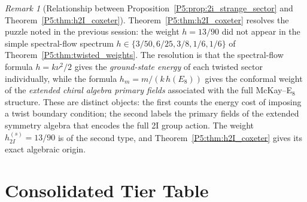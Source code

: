 \documentclass[11pt,a4paper]{article}
\theoremstyle{definition}
\theoremstyle{remark}
\newtheorem{remark}[theorem]{Remark}
\begin{document}
\begin{remark}[Relationship between Proposition~\ref{P5:prop:2i_strange_sector} and Theorem~\ref{P5:thm:h2I_coxeter}]
\label{P5:rem:h2I_status}
Theorem~\ref{P5:thm:h2I_coxeter} resolves the puzzle noted in the previous
session: the weight $h=13/90$ did not appear in the simple spectral-flow
spectrum $h \in \{3/50, 6/25, 3/8, 1/6, 1/6\}$ of
Theorem~\ref{P5:thm:twisted_weights}.
The resolution is that the spectral-flow formula $h = k\nu^2/2$ gives the
\emph{ground-state energy} of each twisted sector individually, while the
formula $h_m = m/(k\,h(E_8))$ gives the conformal weight of the
\emph{extended chiral algebra primary fields} associated with the full
McKay--E$_8$~\cite{McKay1980} structure.
These are distinct objects: the first counts the energy cost of imposing
a twist boundary condition; the second labels the primary fields of the
extended symmetry algebra that encodes the full 2I group action.
The weight $h_{2I}^{(s)} = 13/90$ is of the second type, and
Theorem~\ref{P5:thm:h2I_coxeter} gives its exact algebraic origin.
\end{remark}

\newpage
\section{Consolidated Tier Table}
\label{P5:sec:tier}
\end{document}
